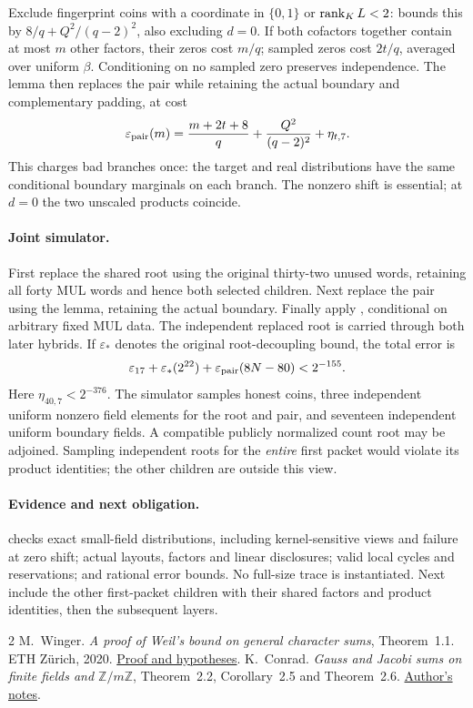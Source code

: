 \documentclass[11pt]{article}
\begin{document}
Exclude fingerprint coins with a coordinate in $\{0,1\}$ or $\operatorname{rank}_{K}L<2$:  bounds this by $8/q+Q^2/(q-2)^2$, also excluding $d=0$. If both cofactors together contain at most $m$ other factors, their zeros cost $m/q$; sampled zeros cost $2t/q$, averaged over uniform $\beta$. Conditioning on no sampled zero preserves independence. The lemma then replaces the pair while retaining the actual boundary and complementary padding, at cost
\[
 \varepsilon_{\rm pair}(m)
 =\frac{m+2t+8}{q}+\frac{Q^2}{(q-2)^2}+\eta_{t,7}.
\]
This charges bad branches once: the target and real distributions have the same conditional boundary marginals on each branch. The nonzero shift is essential; at $d=0$ the two unscaled products coincide.

\paragraph{Joint simulator.} First replace the shared root using the original thirty-two unused words, retaining all forty MUL words and hence both selected children. Next replace the pair using the lemma, retaining the actual boundary. Finally apply , conditional on arbitrary fixed MUL data. The independent replaced root is carried through both later hybrids. If $\varepsilon_*$ denotes the original root-decoupling bound, the total error is
\[
 \varepsilon_{17}+\varepsilon_*(2^{22})
 +\varepsilon_{\rm pair}(8N-80)<2^{-155}.
\]
Here $\eta_{40,7}<2^{-376}$. The simulator samples honest coins, three independent uniform nonzero field elements for the root and pair, and seventeen independent uniform boundary fields. A compatible publicly normalized count root may be adjoined. Sampling independent roots for the \emph{entire} first packet would violate its product identities; the other children are outside this view.

\paragraph{Evidence and next obligation.}  checks exact small-field distributions, including kernel-sensitive views and failure at zero shift; actual layouts, factors and linear disclosures; valid local cycles and reservations; and rational error bounds. No full-size trace is instantiated. Next include the other first-packet children with their shared factors and product identities, then the subsequent layers.

\begin{thebibliography}{2}
 M.~Winger. \emph{A proof of Weil's bound on general character sums}, Theorem~1.1. ETH Z\"urich, 2020. \href{https://people.math.ethz.ch/~pinkri/Theses/2020-Bachelor-Moritz-Winger.pdf}{Proof and hypotheses}.
 K.~Conrad. \emph{Gauss and Jacobi sums on finite fields and $\mathbb Z/m\mathbb Z$}, Theorem~2.2, Corollary~2.5 and Theorem~2.6. \href{https://kconrad.math.uconn.edu/blurbs/gradnumthy/Gauss-Jacobi-sums.pdf}{Author's notes}.
\end{thebibliography}
\end{document}
